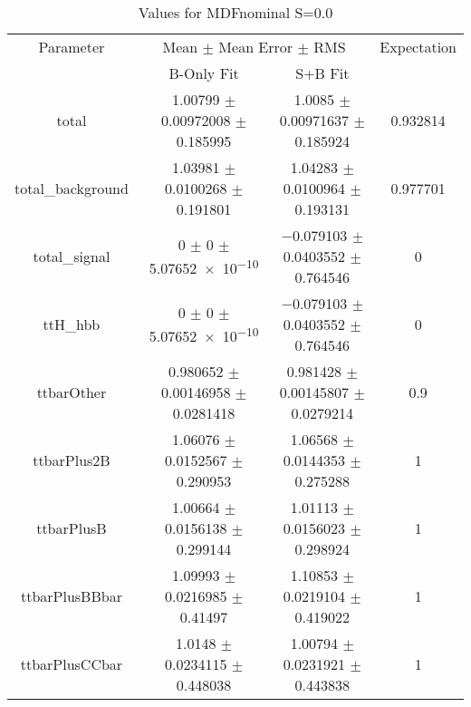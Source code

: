 \begin{table}
\centering
\caption{Values for MDFnominal S=0.0}
\begin{tabular}{cccc}
\toprule
Parameter & \multicolumn{2}{c}{Mean $\pm$ Mean Error $\pm$ RMS} & Expectation\\
 & B-Only Fit & S+B Fit & \\
\midrule
total & \num{1.00799} $\pm$ \num{0.00972008} $\pm$ \num{0.185995} & \num{1.0085} $\pm$ \num{0.00971637} $\pm$ \num{0.185924} & \num{0.932814}\\
total\_background & \num{1.03981} $\pm$ \num{0.0100268} $\pm$ \num{0.191801} & \num{1.04283} $\pm$ \num{0.0100964} $\pm$ \num{0.193131} & \num{0.977701}\\
total\_signal & \num{0} $\pm$ \num{0} $\pm$ \num{5.07652e-10} & \num{-0.079103} $\pm$ \num{0.0403552} $\pm$ \num{0.764546} & \num{0}\\
ttH\_hbb & \num{0} $\pm$ \num{0} $\pm$ \num{5.07652e-10} & \num{-0.079103} $\pm$ \num{0.0403552} $\pm$ \num{0.764546} & \num{0}\\
ttbarOther & \num{0.980652} $\pm$ \num{0.00146958} $\pm$ \num{0.0281418} & \num{0.981428} $\pm$ \num{0.00145807} $\pm$ \num{0.0279214} & \num{0.9}\\
ttbarPlus2B & \num{1.06076} $\pm$ \num{0.0152567} $\pm$ \num{0.290953} & \num{1.06568} $\pm$ \num{0.0144353} $\pm$ \num{0.275288} & \num{1}\\
ttbarPlusB & \num{1.00664} $\pm$ \num{0.0156138} $\pm$ \num{0.299144} & \num{1.01113} $\pm$ \num{0.0156023} $\pm$ \num{0.298924} & \num{1}\\
ttbarPlusBBbar & \num{1.09993} $\pm$ \num{0.0216985} $\pm$ \num{0.41497} & \num{1.10853} $\pm$ \num{0.0219104} $\pm$ \num{0.419022} & \num{1}\\
ttbarPlusCCbar & \num{1.0148} $\pm$ \num{0.0234115} $\pm$ \num{0.448038} & \num{1.00794} $\pm$ \num{0.0231921} $\pm$ \num{0.443838} & \num{1}\\
\bottomrule
\end{tabular}
\end{table}